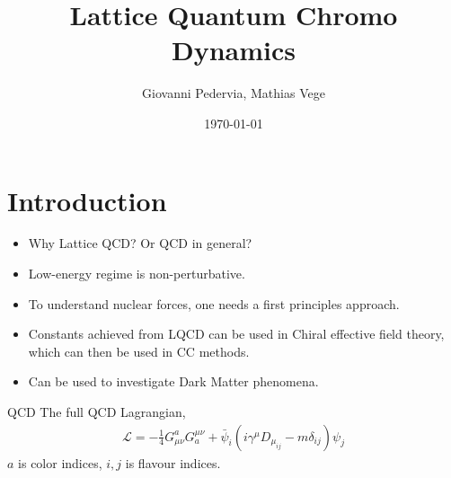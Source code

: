 \documentclass[10pt]{beamer}
\title{Lattice Quantum Chromo Dynamics}
\date{\today}
\author{Giovanni Pedervia, Mathias Vege}
\institute{University of Oslo}
\begin{document}
\maketitle


\section{Introduction}
\begin{frame}
	\begin{itemize}%
		\item Why Lattice QCD? Or QCD in general?
		\item Low-energy regime is non-perturbative.
		\item To understand nuclear forces, one needs a first principles approach.
		\item Constants achieved from LQCD can be used in Chiral effective field theory, which can then be used in CC methods.
		\item Can be used to investigate Dark Matter phenomena.
	\end{itemize}
\end{frame}


\begin{frame}{QCD}
	The full QCD Lagrangian,
	\begin{align}
		\mathcal{L} = -\frac{1}{4} G_{\mu\nu}^a G^{\mu\nu}_a + \bar{\psi}_i (i\gamma^{\mu} D_{\mu}_{ij} - m\delta_{ij})\psi_j
	\end{align}
	$a$ is color indices, $i,j$ is flavour indices.
\end{frame}
\end{document}
